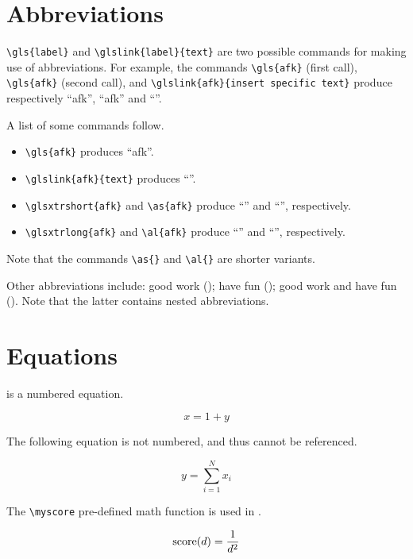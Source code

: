 \section{Abbreviations}
\label{c2:s:abbreviations}

\verb+\gls{label}+ and \verb+\glslink{label}{text}+ are two possible commands for making use of abbreviations.
For example, the commands \verb+\gls{afk}+ (first call), \verb+\gls{afk}+ (second call), and \verb+\glslink{afk}{insert specific text}+ produce respectively ``\gls{afk}'', ``\gls{afk}'' and ``''.

A list of some commands follow.

\begin{itemize}
\item
\verb+\gls{afk}+ produces ``\gls{afk}''.
\item
\verb+\glslink{afk}{text}+ produces ``''.
\item
\verb+\glsxtrshort{afk}+ and \verb+\as{afk}+ produce ``'' and ``'', respectively.
\item
\verb+\glsxtrlong{afk}+ and \verb+\al{afk}+ produce ``'' and ``'', respectively.
\end{itemize}

Note that the commands \verb+\as{}+ and \verb+\al{}+ are shorter variants.

Other abbreviations include: good work (); have fun (); good work and have fun ().
Note that the latter contains nested abbreviations.


\section{Equations}
\label{c2:s:equations}

 is a numbered equation.

\begin{equation}
\label{eq:example1}
x = 1 + y
\end{equation}

The following equation is not numbered, and thus cannot be referenced.

\begin{equation*}
y = \sum_{i=1}^{N}{x_i}
\end{equation*}

The \verb+\myscore+ pre-defined math function is used in .

\begin{equation}
\label{eq:example2}
\operatorname{score}(d) = \frac{1}{d^2}
\end{equation}



